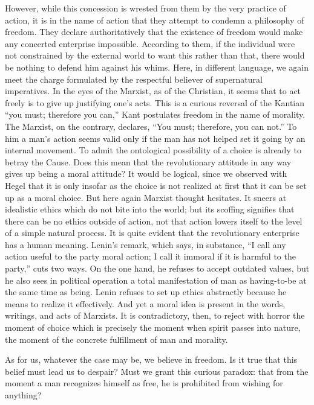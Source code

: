 \documentclass[11pt]{article}
\begin{document}
However, while this concession is wrested from them by the very practice of action, it is in the name of action that they attempt to condemn a philosophy of freedom. They declare authoritatively that the existence of freedom would make any concerted enterprise impossible. According to them, if the individual were not constrained by the external world to want this rather than that, there would be nothing to defend him against his whims. Here, in different language, we again meet the charge formulated by the respectful believer of supernatural imperatives. In the eyes of the Marxist, as of the Christian, it seems that to act freely is to give up justifying one’s acts. This is a curious reversal of the Kantian “you must; therefore you can,” Kant postulates freedom in the name of morality. The Marxist, on the contrary, declares, “You must; therefore, you can not.” To him a man’s action seems valid only if the man has not helped set it going by an internal movement. To admit the ontological possibility of a choice is already to betray the Cause. Does this mean that the revolutionary attitude in any way gives up being a moral attitude? It would be logical, since we observed with Hegel that it is only insofar as the choice is not realized at first that it can be set up as a moral choice. But here again Marxist thought hesitates. It sneers at idealistic ethics which do not bite into the world; but its scoffing signifies that there can be no ethics outside of action, not that action lowers itself to the level of a simple natural process. It is quite evident that the revolutionary enterprise has a human meaning. Lenin’s remark, which says, in substance, “I call any action useful to the party moral action; I call it immoral if it is harmful to the party,” cuts two ways. On the one hand, he refuses to accept outdated values, but he also sees in political operation a total manifestation of man as having-to-be at the same time as being. Lenin refuses to set up ethics abstractly because he means to realize it effectively. And yet a moral idea is present in the words, writings, and acts of Marxists. It is contradictory, then, to reject with horror the moment of choice which is precisely the moment when spirit passes into nature, the moment of the concrete fulfillment of man and morality.

As for us, whatever the case may be, we believe in freedom. Is it true that this belief must lead us to despair? Must we grant this curious paradox: that from the moment a man recognizes himself as free, he is prohibited from wishing for anything?
\end{document}
